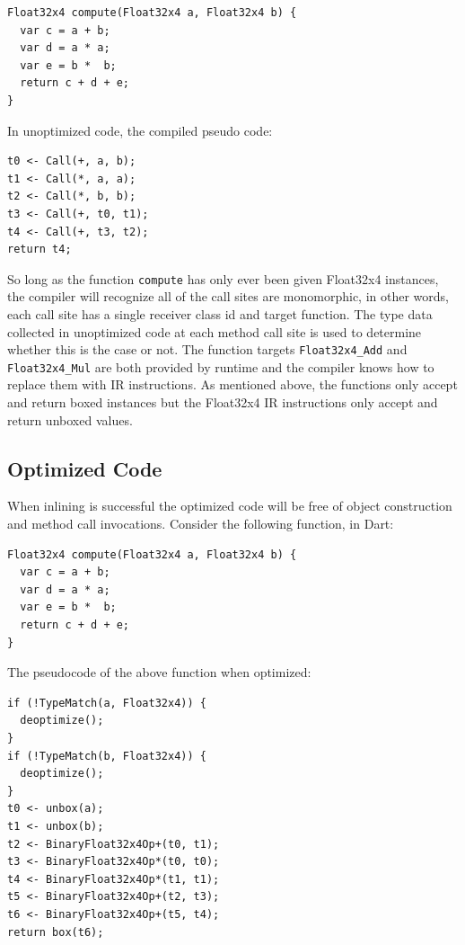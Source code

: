 \documentclass[preprint]{sigplanconf}
\begin{document}
\begin{small}
\begin{lstlisting}
Float32x4 compute(Float32x4 a, Float32x4 b) {
  var c = a + b;
  var d = a * a;
  var e = b *  b;
  return c + d + e;
}
\end{lstlisting}
\end{small}

In unoptimized code, the compiled pseudo code:

\begin{small}
\begin{lstlisting}
t0 <- Call(+, a, b);
t1 <- Call(*, a, a);
t2 <- Call(*, b, b);
t3 <- Call(+, t0, t1);
t4 <- Call(+, t3, t2);
return t4;
\end{lstlisting}
\end{small}

So long as the function \verb!compute! has only ever been given Float32x4
instances, the compiler will recognize all of the call sites are monomorphic, in
other words, each call site has a single receiver class id and target function.
The type data collected in unoptimized code at each method call site is used to
determine whether this is the case or not. The function targets
\verb!Float32x4_Add! and \verb!Float32x4_Mul! are both provided by runtime and
the compiler knows how to replace them with IR instructions. As mentioned above,
the functions only accept and return boxed instances but the Float32x4 IR
instructions only accept and return unboxed values.

\subsection{Optimized Code}

When inlining is successful the optimized code will be free of object
construction and method call invocations. Consider the following function, in
Dart:

\begin{small}
\begin{lstlisting}
Float32x4 compute(Float32x4 a, Float32x4 b) {
  var c = a + b;
  var d = a * a;
  var e = b *  b;
  return c + d + e;
}
\end{lstlisting}
\end{small}

The pseudocode of the above function when optimized:

\begin{small}
\begin{lstlisting}
if (!TypeMatch(a, Float32x4)) {
  deoptimize();
}
if (!TypeMatch(b, Float32x4)) {
  deoptimize();
}
t0 <- unbox(a);
t1 <- unbox(b);
t2 <- BinaryFloat32x4Op+(t0, t1);
t3 <- BinaryFloat32x4Op*(t0, t0);
t4 <- BinaryFloat32x4Op*(t1, t1);
t5 <- BinaryFloat32x4Op+(t2, t3);
t6 <- BinaryFloat32x4Op+(t5, t4);
return box(t6);
\end{lstlisting}
\end{small}
\end{document}
